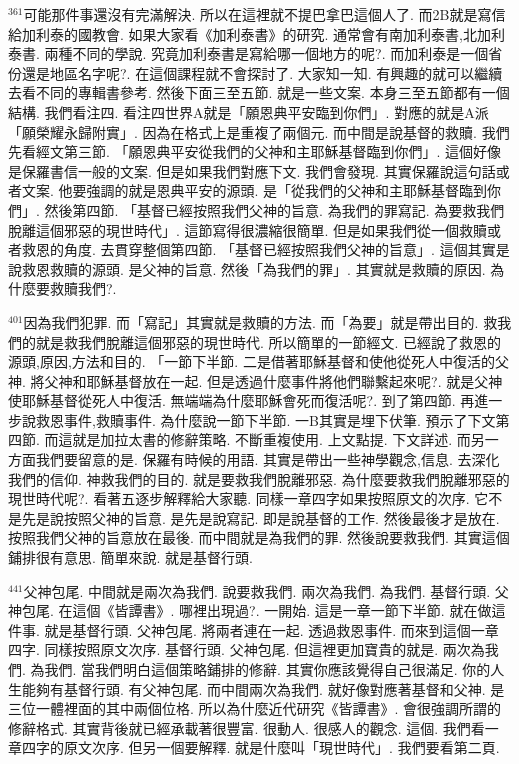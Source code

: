 \documentclass{book}
\begin{document}
$^{361}$可能那件事還沒有完滿解決.
所以在這裡就不提巴拿巴這個人了.
而2B就是寫信給加利泰的國教會.
如果大家看《加利泰書》的研究.
通常會有南加利泰書,北加利泰書.
兩種不同的學說.
究竟加利泰書是寫給哪一個地方的呢?.
而加利泰是一個省份還是地區名字呢?.
在這個課程就不會探討了.
大家知一知.
有興趣的就可以繼續去看不同的專輯書參考.
然後下面三至五節.
就是一些文案.
本身三至五節都有一個結構.
我們看注四.
看注四世界A就是「願恩典平安臨到你們」.
對應的就是A派「願榮耀永歸附實」.
因為在格式上是重複了兩個元.
而中間是說基督的救贖.
我們先看經文第三節.
「願恩典平安從我們的父神和主耶穌基督臨到你們」.
這個好像是保羅書信一般的文案.
但是如果我們對應下文.
我們會發現.
其實保羅說這句話或者文案.
他要強調的就是恩典平安的源頭.
是「從我們的父神和主耶穌基督臨到你們」.
然後第四節.
「基督已經按照我們父神的旨意.
為我們的罪寫記.
為要救我們脫離這個邪惡的現世時代」.
這節寫得很濃縮很簡單.
但是如果我們從一個救贖或者救恩的角度.
去貫穿整個第四節.
「基督已經按照我們父神的旨意」.
這個其實是說救恩救贖的源頭.
是父神的旨意.
然後「為我們的罪」.
其實就是救贖的原因.
為什麼要救贖我們?.

$^{401}$因為我們犯罪.
而「寫記」其實就是救贖的方法.
而「為要」就是帶出目的.
救我們的就是救我們脫離這個邪惡的現世時代.
所以簡單的一節經文.
已經說了救恩的源頭,原因,方法和目的.
「一節下半節.
二是借著耶穌基督和使他從死人中復活的父神.
將父神和耶穌基督放在一起.
但是透過什麼事件將他們聯繫起來呢?.
就是父神使耶穌基督從死人中復活.
無端端為什麼耶穌會死而復活呢?.
到了第四節.
再進一步說救恩事件,救贖事件.
為什麼說一節下半節.
一B其實是埋下伏筆.
預示了下文第四節.
而這就是加拉太書的修辭策略.
不斷重複使用.
上文點提.
下文詳述.
而另一方面我們要留意的是.
保羅有時候的用語.
其實是帶出一些神學觀念,信息.
去深化我們的信仰.
神救我們的目的.
就是要救我們脫離邪惡.
為什麼要救我們脫離邪惡的現世時代呢?.
看著五逐步解釋給大家聽.
同樣一章四字如果按照原文的次序.
它不是先是說按照父神的旨意.
是先是說寫記.
即是說基督的工作.
然後最後才是放在.
按照我們父神的旨意放在最後.
而中間就是為我們的罪.
然後說要救我們.
其實這個鋪排很有意思.
簡單來說.
就是基督行頭.

$^{441}$父神包尾.
中間就是兩次為我們.
說要救我們.
兩次為我們.
為我們.
基督行頭.
父神包尾.
在這個《皆譚書》.
哪裡出現過?.
一開始.
這是一章一節下半節.
就在做這件事.
就是基督行頭.
父神包尾.
將兩者連在一起.
透過救恩事件.
而來到這個一章四字.
同樣按照原文次序.
基督行頭.
父神包尾.
但這裡更加寶貴的就是.
兩次為我們.
為我們.
當我們明白這個策略鋪排的修辭.
其實你應該覺得自己很滿足.
你的人生能夠有基督行頭.
有父神包尾.
而中間兩次為我們.
就好像對應著基督和父神.
是三位一體裡面的其中兩個位格.
所以為什麼近代研究《皆譚書》.
會很強調所謂的修辭格式.
其實背後就已經承載著很豐富.
很動人.
很感人的觀念.
這個.
我們看一章四字的原文次序.
但另一個要解釋.
就是什麼叫「現世時代」.
我們要看第二頁.
\end{document}
